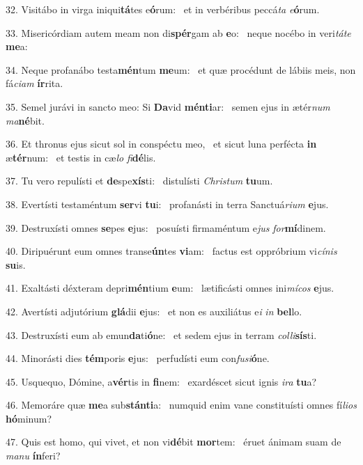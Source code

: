 32. Visitábo in virga iniqui\textbf{tá}tes e\textbf{ó}rum: \ast\  et in verbéribus peccá\textit{ta} \textit{e}\textbf{ó}rum.\

33. Misericórdiam autem meam non di\textbf{spér}gam ab \textbf{e}o: \ast\  neque nocébo in veri\textit{tá}\textit{te} \textbf{me}a:\

34. Neque profanábo testa\textbf{mén}tum \textbf{me}um: \ast\  et quæ procédunt de lábiis meis, non fá\textit{ci}\textit{am} \textbf{ír}rita.\

35. Semel jurávi in sancto meo: Si \textbf{Da}vid \textbf{mén}\textbf{ti}ar: \ast\  semen ejus in ætér\textit{num} \textit{ma}\textbf{né}bit.\

36. Et thronus ejus sicut sol in conspéctu meo, \dag\  et sicut luna perfécta \textbf{in} æ\textbf{tér}num: \ast\  et testis in cæ\textit{lo} \textit{fi}\textbf{dé}lis.\

37. Tu vero repulísti et \textbf{de}spe\textbf{xís}ti: \ast\  distulísti \textit{Chris}\textit{tum} \textbf{tu}um.\

38. Evertísti testaméntum \textbf{ser}vi \textbf{tu}i: \ast\  profanásti in terra Sanctuá\textit{ri}\textit{um} \textbf{e}jus.\

39. Destruxísti omnes \textbf{se}pes \textbf{e}jus: \ast\  posuísti firmaméntum e\textit{jus} \textit{for}\textbf{mí}dinem.\

40. Diripuérunt eum omnes transe\textbf{ún}tes \textbf{vi}am: \ast\  factus est oppróbrium vi\textit{cí}\textit{nis} \textbf{su}is.\

41. Exaltásti déxteram depri\textbf{mén}tium \textbf{e}um: \ast\  lætificásti omnes ini\textit{mí}\textit{cos} \textbf{e}jus.\

42. Avertísti adjutórium \textbf{glá}dii \textbf{e}jus: \ast\  et non es auxiliátus e\textit{i} \textit{in} \textbf{bel}lo.\

43. Destruxísti eum ab emun\textbf{da}ti\textbf{ó}ne: \ast\  et sedem ejus in terram \textit{col}\textit{li}\textbf{sís}ti.\

44. Minorásti dies \textbf{tém}poris \textbf{e}jus: \ast\  perfudísti eum con\textit{fu}\textit{si}\textbf{ó}ne.\

45. Usquequo, Dómine, a\textbf{vér}tis in \textbf{fi}nem: \ast\  exardéscet sicut ignis \textit{i}\textit{ra} \textbf{tu}a?\

46. Memoráre quæ \textbf{me}a sub\textbf{stán}\textbf{ti}a: \ast\  numquid enim vane constituísti omnes fí\textit{li}\textit{os} \textbf{hó}minum?\

47. Quis est homo, qui vivet, et non vi\textbf{dé}bit \textbf{mor}tem: \ast\  éruet ánimam suam de \textit{ma}\textit{nu} \textbf{ín}feri?\

